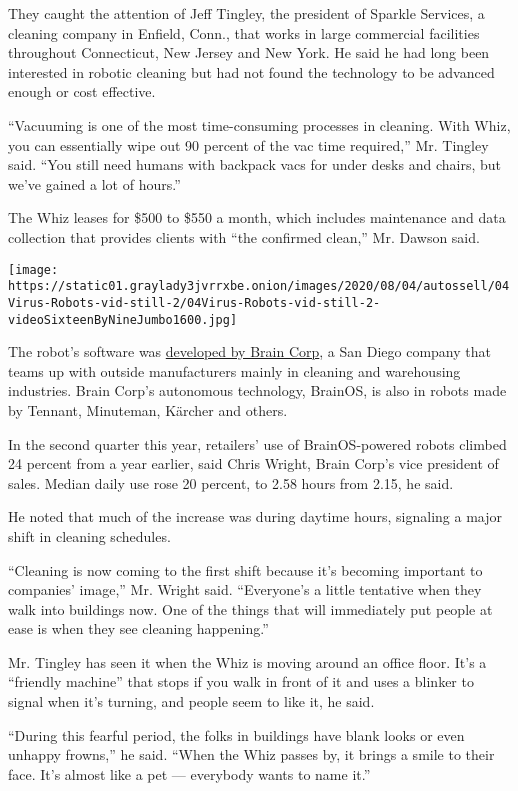 They caught the attention of Jeff Tingley, the president of Sparkle
Services, a cleaning company in Enfield, Conn., that works in large
commercial facilities throughout Connecticut, New Jersey and New York.
He said he had long been interested in robotic cleaning but had not
found the technology to be advanced enough or cost effective.

``Vacuuming is one of the most time-consuming processes in cleaning.
With Whiz, you can essentially wipe out 90 percent of the vac time
required,'' Mr. Tingley said. ``You still need humans with backpack vacs
for under desks and chairs, but we've gained a lot of hours.''

The Whiz leases for \$500 to \$550 a month, which includes maintenance
and data collection that provides clients with ``the confirmed clean,''
Mr. Dawson said.

\texttt{[image: https://static01.graylady3jvrrxbe.onion/images/2020/08/04/autossell/04Virus-Robots-vid-still-2/04Virus-Robots-vid-still-2-videoSixteenByNineJumbo1600.jpg]}

The robot's software was
\href{https://www.nytimes3xbfgragh.onion/2020/04/10/business/coronavirus-workplace-automation.html}{developed
by Brain Corp}, a San Diego company that teams up with outside
manufacturers mainly in cleaning and warehousing industries. Brain
Corp's autonomous technology, BrainOS, is also in robots made by
Tennant, Minuteman, Kärcher and others.

In the second quarter this year, retailers' use of BrainOS-powered
robots climbed 24 percent from a year earlier, said Chris Wright, Brain
Corp's vice president of sales. Median daily use rose 20 percent, to
2.58 hours from 2.15, he said.

He noted that much of the increase was during daytime hours, signaling a
major shift in cleaning schedules.

``Cleaning is now coming to the first shift because it's becoming
important to companies' image,'' Mr. Wright said. ``Everyone's a little
tentative when they walk into buildings now. One of the things that will
immediately put people at ease is when they see cleaning happening.''

Mr. Tingley has seen it when the Whiz is moving around an office floor.
It's a ``friendly machine'' that stops if you walk in front of it and
uses a blinker to signal when it's turning, and people seem to like it,
he said.

``During this fearful period, the folks in buildings have blank looks or
even unhappy frowns,'' he said. ``When the Whiz passes by, it brings a
smile to their face. It's almost like a pet --- everybody wants to name
it.''

